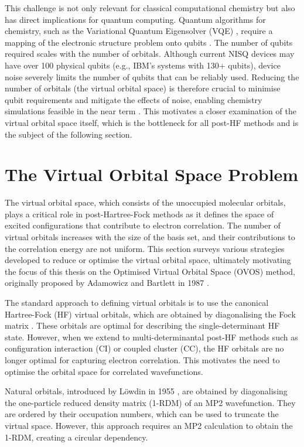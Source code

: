 This challenge is not only relevant for classical computational chemistry but also has direct implications for quantum computing. Quantum algorithms for chemistry, such as the Variational Quantum Eigensolver (VQE) \cite{Peruzzo2014}, require a mapping of the electronic structure problem onto qubits \cite{Peruzzo2014}. The number of qubits required scales with the number of orbitals. Although current NISQ devices may have over 100 physical qubits (e.g., IBM's systems with 130+ qubits), device noise severely limits the number of qubits that can be reliably used. Reducing the number of orbitals (the virtual orbital space) is therefore crucial to minimise qubit requirements and mitigate the effects of noise, enabling chemistry simulations feasible in the near term \cite{Cao2019}. This motivates a closer examination of the virtual orbital space itself, which is the bottleneck for all post-HF methods and is the subject of the following section.

\section{The Virtual Orbital Space Problem}
\label{sec:int_virt_orb}

The virtual orbital space, which consists of the unoccupied molecular orbitals, plays a critical role in post-Hartree-Fock methods as it defines the space of excited configurations that contribute to electron correlation. The number of virtual orbitals increases with the size of the basis set, and their contributions to the correlation energy are not uniform. This section surveys various strategies developed to reduce or optimise the virtual orbital space, ultimately motivating the focus of this thesis on the Optimised Virtual Orbital Space (OVOS) method, originally proposed by Adamowicz and Bartlett in 1987 \cite{Adamowicz1987}.

The standard approach to defining virtual orbitals is to use the canonical Hartree-Fock (HF) virtual orbitals, which are obtained by diagonalising the Fock matrix \cite{Helgaker2000}. These orbitals are optimal for describing the single-determinant HF state. However, when we extend to multi-determinantal post-HF methods such as configuration interaction (CI) or coupled cluster (CC), the HF orbitals are no longer optimal for capturing electron correlation. This motivates the need to optimise the orbital space for correlated wavefunctions.

Natural orbitals, introduced by Löwdin in 1955 \cite{Lowdin1955}, are obtained by diagonalising the one-particle reduced density matrix (1-RDM) of an MP2 wavefunction. They are ordered by their occupation numbers, which can be used to truncate the virtual space. However, this approach requires an MP2 calculation to obtain the 1-RDM, creating a circular dependency.

